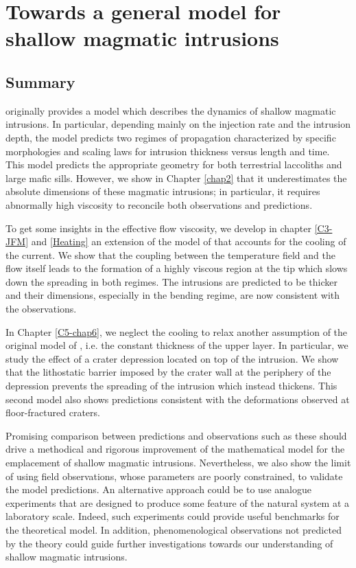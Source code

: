 \chapter{Towards a general model for shallow magmatic intrusions}
\label{chap7}

\section{Summary}
\label{sec:summary-2}

\citet{Michaut:2011kg} originally provides a model which describes the
dynamics  of shallow  magmatic  intrusions.  In particular,  depending
mainly  on the  injection  rate  and the  intrusion  depth, the  model
predicts  two   regimes  of  propagation  characterized   by  specific
morphologies and  scaling laws  for intrusion thickness  versus length
and  time.  This model  predicts  the  appropriate geometry  for  both
terrestrial  laccoliths and  large mafic  sills. However,  we show  in
Chapter \ref{chap2} that it  underestimates the absolute dimensions of
these magmatic intrusions; in  particular, it requires abnormally high
viscosity to reconcile both observations and predictions.

To get  some insights in the  effective flow viscosity, we  develop in
chapter \ref{C3-JFM}  and \ref{Heating} an  extension of the  model of
\citet{Michaut:2011kg} that  accounts for the cooling  of the current.
We show that  the coupling between the temperature field  and the flow
itself leads  to the formation of  a highly viscous region  at the tip
which slows  down the  spreading in both  regimes. The  intrusions are
predicted  to  be thicker  and  their  dimensions, especially  in  the
bending regime, are now consistent with the observations.

In Chapter  \ref{C5-chap6}, we  neglect the  cooling to  relax another
assumption of  the original model of  \citet{Michaut:2011kg}, i.e. the
constant thickness  of the  upper layer. In  particular, we  study the
effect of a crater depression located on top of the intrusion. We show
that  the  lithostatic barrier  imposed  by  the  crater wall  at  the
periphery of  the depression prevents  the spreading of  the intrusion
which  instead  thickens. This  second  model  also shows  predictions
consistent with the deformations observed at floor-fractured craters.

Promising  comparison between  predictions  and  observations such  as
these  should  drive a  methodical  and  rigorous improvement  of  the
mathematical model for the emplacement of shallow magmatic intrusions.
Nevertheless,  we also  show the  limit of  using field  observations,
whose  parameters  are  poorly  constrained,  to  validate  the  model
predictions.   An  alternative  approach  could  be  to  use  analogue
experiments that are  designed to produce some feature  of the natural
system at a  laboratory scale. Indeed, such  experiments could provide
useful   benchmarks  for   the   theoretical   model.   In   addition,
phenomenological observations not predicted  by the theory could guide
further investigations  towards our  understanding of  shallow magmatic
intrusions.

